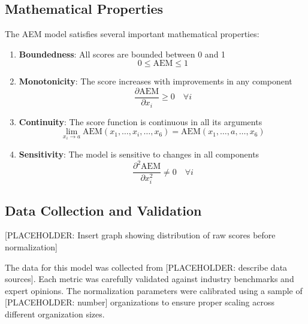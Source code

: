 \documentclass[12pt]{article}
\begin{document}
\subsection{Mathematical Properties}

The AEM model satisfies several important mathematical properties:

\begin{enumerate}
    \item \textbf{Boundedness}: All scores are bounded between 0 and 1
    \begin{equation}
        0 \leq \text{AEM} \leq 1
    \end{equation}
    
    \item \textbf{Monotonicity}: The score increases with improvements in any component
    \begin{equation}
        \frac{\partial \text{AEM}}{\partial x_i} \geq 0 \quad \forall i
    \end{equation}
    
    \item \textbf{Continuity}: The score function is continuous in all its arguments
    \begin{equation}
        \lim_{x_i \to a} \text{AEM}(x_1, \ldots, x_i, \ldots, x_6) = \text{AEM}(x_1, \ldots, a, \ldots, x_6)
    \end{equation}
    
    \item \textbf{Sensitivity}: The model is sensitive to changes in all components
    \begin{equation}
        \frac{\partial^2 \text{AEM}}{\partial x_i^2} \neq 0 \quad \forall i
    \end{equation}
\end{enumerate}

\subsection{Data Collection and Validation}

[PLACEHOLDER: Insert graph showing distribution of raw scores before normalization]

The data for this model was collected from [PLACEHOLDER: describe data sources]. Each metric was carefully validated against industry benchmarks and expert opinions. The normalization parameters were calibrated using a sample of [PLACEHOLDER: number] organizations to ensure proper scaling across different organization sizes.
\end{document}

